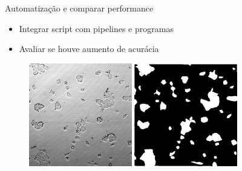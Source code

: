 \documentclass{beamer}
\begin{document}
  \begin{frame}{Automatização e comparar performance}

    \begin{itemize}

    \item Integrar script com pipelines e programas
    \item Avaliar se houve aumento de acurácia
    \end{itemize}

    \begin{figure}
      \includegraphics[width=0.4\textwidth]{imgs/fototif.png}
      \includegraphics[width=0.4\textwidth]{imgs/manual.png}
    \end{figure}

  \end{frame}
\end{document}
